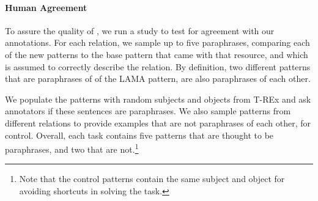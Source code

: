 







\paragraph{Human Agreement}
To assure the quality of \resource{}, we run a study to test for agreement with our annotations.
For each relation, we sample up to five paraphrases, comparing each of the new patterns to the base pattern that came with that resource, and which is assumed to correctly describe the relation.
By definition, two different patterns that are paraphrases of of the LAMA pattern, are also paraphrases of each other.

We populate the patterns with random subjects and objects from T-REx \cite{trex} and ask annotators if these sentences are paraphrases.
We also sample patterns from different relations to provide examples that are not paraphrases of each other, for control.
Overall, each task contains five patterns that are thought to be paraphrases, and two that are not.\footnote{Note that the control patterns contain the same subject and object for avoiding shortcuts in solving the task.}

